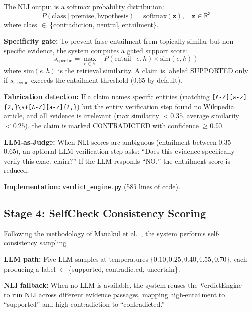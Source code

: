 \documentclass[12pt, a4paper, oneside]{report}
\begin{document}
The NLI output is a softmax probability distribution:
\begin{equation}
P(\text{class} \mid \text{premise}, \text{hypothesis}) = \text{softmax}(\mathbf{z}), \quad \mathbf{z} \in \mathbb{R}^3
\tag{Eq.\ 3}
\end{equation}
where class $\in$ \{contradiction, neutral, entailment\}.

\textbf{Specificity gate:} To prevent false entailment from topically similar but non-specific evidence, the system computes a gated support score:
\begin{equation}
s_{\text{specific}} = \max_{e \in \mathcal{E}} \left( P(\text{entail} \mid e, h) \times \text{sim}(e, h) \right)
\tag{Eq.\ 4}
\end{equation}
where $\text{sim}(e, h)$ is the retrieval similarity. A claim is labeled SUPPORTED only if $s_{\text{specific}}$ exceeds the entailment threshold (0.65 by default).

\textbf{Fabrication detection:} If a claim names specific entities (matching \texttt{[A-Z][a-z]\{2,\}\textbackslash s+[A-Z][a-z]\{2,\}}) but the entity verification step found no Wikipedia article, and all evidence is irrelevant (max similarity $< 0.35$, average similarity $< 0.25$), the claim is marked CONTRADICTED with confidence $\geq 0.90$.

\textbf{LLM-as-Judge:} When NLI scores are ambiguous (entailment between 0.35--0.65), an optional LLM verification step asks: ``Does this evidence specifically verify this exact claim?'' If the LLM responds ``NO,'' the entailment score is reduced.

\textbf{Implementation:} \texttt{verdict\_engine.py} (586 lines of code).

\subsection{Stage 4: SelfCheck Consistency Scoring}
\label{sec:selfcheck}

Following the methodology of Manakul et al.\ \cite{manakul2023selfcheck}, the system performs self-consistency sampling:

\textbf{LLM path:} Five LLM samples at temperatures $\{0.10, 0.25, 0.40, 0.55, 0.70\}$, each producing a label $\in$ \{supported, contradicted, uncertain\}.

\textbf{NLI fallback:} When no LLM is available, the system reuses the VerdictEngine to run NLI across different evidence passages, mapping high-entailment to ``supported'' and high-contradiction to ``contradicted.''
\end{document}

